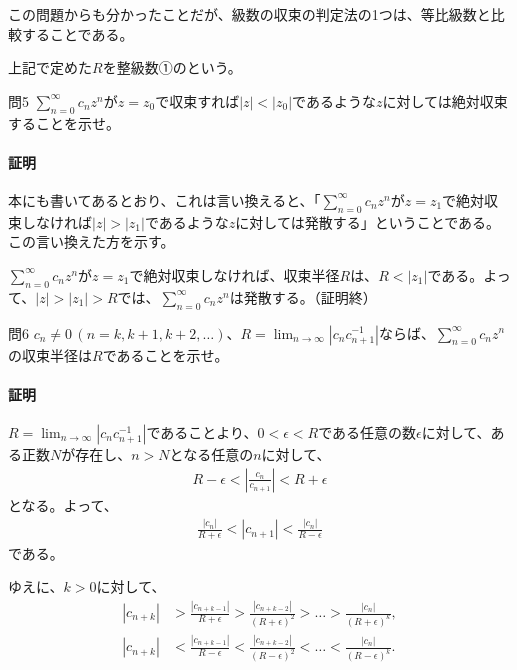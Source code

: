 この問題からも分かったことだが、級数の収束の判定法の1つは、等比級数と比較することである。

上記で定めた$R$を整級数①のという。


\begin{mysimplebox}{問5}
    $\sum_{n=0}^\infty c_nz^n$が$z=z_0$で収束すれば$|z|<|z_0|$であるような$z$に対しては絶対収束することを示せ。
\end{mysimplebox}
\paragraph{証明}
本にも書いてあるとおり、これは言い換えると、「$\sum_{n=0}^\infty c_nz^n$が$z=z_1$で絶対収束しなければ$|z|>|z_1|$であるような$z$に対しては発散する」ということである。この言い換えた方を示す。

$\sum_{n=0}^\infty c_nz^n$が$z=z_1$で絶対収束しなければ、収束半径$R$は、$R<|z_1|$である。よって、$|z|>|z_1|>R$では、$\sum_{n=0}^\infty c_nz^n$は発散する。（証明終）

\begin{mysimplebox}{問6}
    $c_n\neq 0\,(n=k, k+1, k+2,\dots)$、$R=\lim_{n\to\infty}|c_nc_{n+1}^{-1}|$ならば、$\sum_{n=0}^\infty c_nz^n$の収束半径は$R$であることを示せ。
\end{mysimplebox}
\paragraph{証明}
$R=\lim_{n\to\infty}|c_nc_{n+1}^{-1}|$であることより、$0<\epsilon<R$である任意の数$\epsilon$に対して、ある正数$N$が存在し、$n>N$となる任意の$n$に対して、
\begin{align*}
    R-\epsilon<\left|\frac{c_n}{c_{n+1}}\right|<R+\epsilon
\end{align*}
となる。よって、
\begin{align*}
    \frac{|c_n|}{R+\epsilon}<|c_{n+1}|<\frac{|c_n|}{R-\epsilon}
\end{align*}    
である。

ゆえに、$k>0$に対して、
\begin{align}
    |c_{n+k}|&>\frac{|c_{n+k-1}|}{R+\epsilon}>\frac{|c_{n+k-2}|}{(R+\epsilon)^2}>\dots>\frac{|c_{n}|}{(R+\epsilon)^k},\label{eq:convR1}\\
    |c_{n+k}|&<\frac{|c_{n+k-1}|}{R-\epsilon}<\frac{|c_{n+k-2}|}{(R-\epsilon)^2}<\dots<\frac{|c_{n}|}{(R-\epsilon)^k}.\label{eq:convR2}
\end{align}

